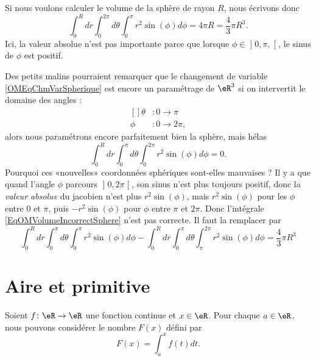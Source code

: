 Si nous voulons calculer le volume de la sphère de rayon \( R\), nous écrivons donc
\begin{equation}
	\int_0^Rdr\int_{0}^{2\pi}d\theta\int_0^{\pi}r^2 \sin(\phi)d\phi=4\pi R=\frac{ 4 }{ 3 }\pi R^3.
\end{equation}
Ici, la valeur absolue n'est pas importante parce que lorsque \( \phi\in\mathopen] 0,\pi ,  \mathclose[\), le sinus de \( \phi\) est positif.

	Des petits malins pourraient remarquer que le changement de variable \eqref{OMEqChmVarSpherique} est encore un paramétrage de \( \eR^3\) si on intervertit le domaine des angles :
	\begin{equation}
		\begin{aligned}[]
			\theta & \colon 0 \to \pi  \\
			\phi   & \colon 0\to 2\pi,
		\end{aligned}
	\end{equation}
	alors nous paramétrons encore parfaitement bien la sphère, mais hélas
	\begin{equation}		\label{EqOMVolumeIncorrectSphere}
		\int_0^Rdr\int_{0}^{\pi}d\theta\int_0^{2\pi}r^2 \sin(\phi)d\phi=0.
	\end{equation}
	Pourquoi ces «nouvelles» coordonnées sphériques sont-elles mauvaises ? Il y a que quand l'angle \( \phi\) parcours \( \mathopen] 0 , 2\pi \mathclose[\), son sinus n'est plus toujours positif, donc la \emph{valeur absolue} du jacobien n'est plus \( r^2\sin(\phi)\), mais \( r^2\sin(\phi)\) pour les \( \phi\) entre \( 0\) et \( \pi\), puis \( -r^2\sin(\phi)\) pour \( \phi\) entre \( \pi\) et \( 2\pi\). Donc l'intégrale \eqref{EqOMVolumeIncorrectSphere} n'est pas correcte. Il faut la remplacer par
\begin{equation}
	\int_0^Rdr\int_{0}^{\pi}d\theta\int_0^{\pi}r^2 \sin(\phi)d\phi- \int_0^Rdr\int_{0}^{\pi}d\theta\int_{\pi}^{2\pi}r^2 \sin(\phi)d\phi = \frac{ 4 }{ 3 }\pi R^3
\end{equation}

\section{Aire et primitive}

Soient \( f\colon \eR\to \eR\) une fonction continue et \( x\in\eR\). Pour chaque \( a\in\eR\), nous pouvons considérer le nombre \( F(x)\) défini par
\begin{equation}
	F(x)=\int_a^x f(t)dt.
\end{equation}

